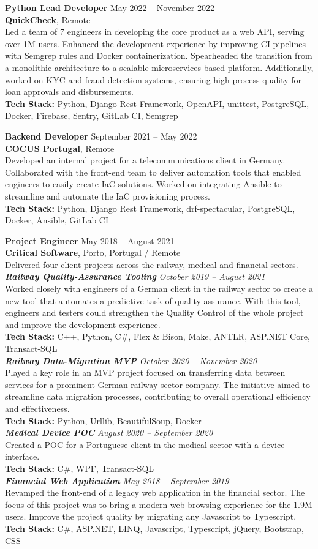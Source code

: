 \documentclass[margin, 10pt]{res} %
\newcommand{\jobheader}[4]{%
    \textbf{#1} \hfill #4\\
    \textbf{#2}, #3%
}
\newcommand{\jobentry}[6]{%
    \jobheader{#1}{#2}{#3}{#4}\\
    #5\\
    \textbf{Tech Stack:} #6
}
\newcommand{\projectentry}[4]{%
    \textbf{\textit{#1}} \hfill \textit{#2}\\
    #3\\
    \textbf{Tech Stack:} #4
}
\begin{document}
\begin{resume}
    \jobentry{Python Lead Developer}{QuickCheck}{Remote}{May 2022 -- November 2022}{%
Led a team of 7 engineers in developing the core product as a web API, serving over 1M users. Enhanced the development experience by improving CI pipelines with Semgrep rules and Docker containerization. Spearheaded the transition from a monolithic architecture to a scalable microservices-based platform. Additionally, worked on KYC and fraud detection systems, ensuring high process quality for loan approvals and disbursements.%
}{Python, Django Rest Framework, OpenAPI, unittest, PostgreSQL, Docker, Firebase, Sentry, GitLab CI, Semgrep}


    \jobentry{Backend Developer}{COCUS Portugal}{Remote}{September 2021 -- May 2022}{%
Developed an internal project for a telecommunications client in Germany. Collaborated with the front-end team to deliver automation tools that enabled engineers to easily create IaC solutions. Worked on integrating Ansible to streamline and automate the IaC provisioning process.%
}{Python, Django Rest Framework, drf-spectacular, PostgreSQL, Docker, Ansible, GitLab CI}


    \jobheader{Project Engineer}{Critical Software}{Porto, Portugal / Remote}{May 2018 -- August 2021}\\
    Delivered four client projects across the railway, medical and financial sectors.\\
    \projectentry{Railway Quality-Assurance Tooling}{October 2019 -- August 2021}{%
Worked closely with engineers of a German client in the railway sector to create a new tool that automates a predictive task of quality assurance. With this tool, engineers and testers could strengthen the Quality Control of the whole project and improve the development experience.%
}{C++, Python, C\#, Flex \& Bison, Make, ANTLR, ASP.NET Core, Transact-SQL}\\
    \projectentry{Railway Data-Migration MVP}{October 2020 -- November 2020}{%
Played a key role in an MVP project focused on transferring data between services for a prominent German railway sector company. The initiative aimed to streamline data migration processes, contributing to overall operational efficiency and effectiveness.%
}{Python, Urllib, BeautifulSoup, Docker}\\
    \projectentry{Medical Device POC}{August 2020 -- September 2020}{%
Created a POC for a Portuguese client in the medical sector with a device interface.%
}{C\#, WPF, Transact-SQL}\\
    \projectentry{Financial Web Application}{May 2018 -- September 2019}{%
Revamped the front-end of a legacy web application in the financial sector. The focus of this project was to bring a modern web browsing experience for the 1.9M users. Improve the project quality by migrating any Javascript to Typescript.%
}{C\#, ASP.NET, LINQ, Javascript, Typescript, jQuery, Bootstrap, CSS}



\end{resume}
\end{document}
